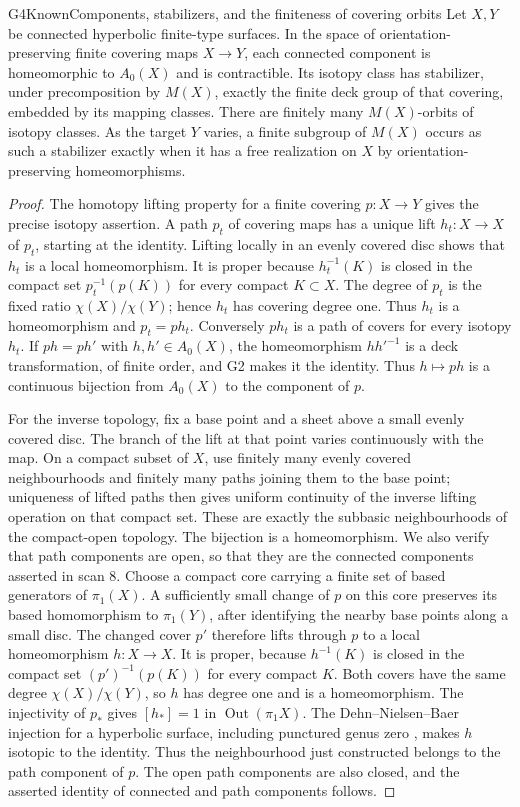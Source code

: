 \begin{result}{G4}{Known}{Components, stabilizers, and the finiteness of covering orbits}
Let $X,Y$ be connected hyperbolic finite-type surfaces. In the space of
orientation-preserving finite covering maps $X\to Y$, each connected component
is homeomorphic to $A_0(X)$ and is contractible. Its isotopy class has
stabilizer, under precomposition by $M(X)$, exactly the finite deck group
of that covering, embedded by its mapping classes. There are finitely
many $M(X)$-orbits of isotopy classes. As the target $Y$ varies, a finite
subgroup of $M(X)$ occurs as such a stabilizer exactly when it has a
free realization on $X$ by orientation-preserving homeomorphisms.
\end{result}
\begin{proof}
The homotopy lifting property for a finite covering $p:X\to Y$ gives
the precise isotopy assertion. A path $p_t$ of covering maps has a
unique lift $h_t:X\to X$ of $p_t$, starting at the identity. Lifting
locally in an evenly covered disc shows that $h_t$ is a local
homeomorphism. It is proper because $h_t^{-1}(K)$ is closed in the
compact set $p_t^{-1}(p(K))$ for every compact $K\subset X$.
The degree of $p_t$ is the fixed ratio $\chi(X)/\chi(Y)$;
hence $h_t$ has covering degree one. Thus $h_t$ is a homeomorphism and $p_t=p h_t$.
Conversely $p h_t$ is a path of covers for every isotopy $h_t$.
If $p h=p h'$ with $h,h'\in A_0(X)$, the homeomorphism $hh'^{-1}$ is
a deck transformation, of finite order, and G2 makes it the identity.
Thus $h\mapsto p h$ is a continuous bijection from $A_0(X)$ to the
component of $p$.

For the inverse topology, fix a base point and a sheet above a small
evenly covered disc. The branch of the lift at that point varies
continuously with the map. On a compact subset of $X$, use finitely
many evenly covered neighbourhoods and finitely many paths joining
them to the base point; uniqueness of lifted paths then gives uniform
continuity of the inverse lifting operation on that compact set.
These are exactly the subbasic neighbourhoods of the compact-open
topology. The bijection is a homeomorphism. We also verify that path
components are open, so that they are the connected components asserted
in scan 8. Choose a compact core carrying a finite set of based
generators of $\pi_1(X)$. A sufficiently small change of $p$ on this
core preserves its based homomorphism to $\pi_1(Y)$, after identifying
the nearby base points along a small disc. The changed cover $p'$
therefore lifts through $p$ to a local homeomorphism $h:X\to X$.
It is proper, because $h^{-1}(K)$ is closed in the compact set
$(p')^{-1}(p(K))$ for every compact $K$. Both covers have the same
degree $\chi(X)/\chi(Y)$, so $h$ has degree one and is a
homeomorphism. The injectivity of $p_*$ gives $[h_*]=1$ in
$\operatorname{Out}(\pi_1X)$. The Dehn--Nielsen--Baer injection for a
hyperbolic surface, including punctured genus zero
\cite[Theorem 8.8]{G_FarbMargalit}, makes $h$ isotopic to the identity.
Thus the neighbourhood just constructed belongs to the path component
of $p$. The open path components are also closed, and the asserted
identity of connected and path components follows.


\end{proof}
